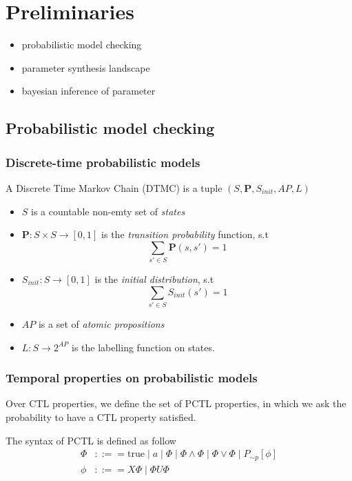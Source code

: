 \chapter{Preliminaries}
 {\color{red}
  \begin{itemize}
      \item probabilistic model checking
      \item parameter synthesis landscape
      \item bayesian inference of parameter
  \end{itemize}
 }

\section{Probabilistic model checking}
\subsection{Discrete-time probabilistic models}
\begin{definition}
    A Discrete Time Markov Chain (DTMC) is a tuple $(S,\mathbf{P}, S_{init}, AP,
        L)$ \cite{baier2008principles}
    \begin{itemize}
        \item $S$ is a countable non-emty set of \textit{states}
        \item $\mathbf{P}:S\times S \rightarrow [0,1]$ is the \textit{transition probability}
              function, s.t $$\sum_{s'\in S}\mathbf{P}(s, s') = 1$$
        \item $S_{init}: S \rightarrow [0,1]$ is the \textit{initial distribution},
              s.t  $$\sum_{s'\in S}S_{init}(s') = 1$$
        \item $AP$ is a set of \textit{atomic propositions}
        \item $L: S \rightarrow 2^{AP}$ is the labelling function on states.
    \end{itemize}
\end{definition}

\subsection{Temporal properties on probabilistic models}
Over CTL properties, we define the set of PCTL properties, in which we ask the probability to have a CTL property satisfied.
\begin{definition} The syntax of PCTL is defined as follow
    \begin{align*}
        \Phi & ::== \text{true} \;|\; a \;|\; \Phi \;|\; \Phi \wedge \Phi \;|\; \Phi \vee \Phi \;|\;  P_{\sim  p}[\phi] \\
        \phi & ::== X\Phi \;|\; \Phi U \Phi
    \end{align*}
\end{definition}

